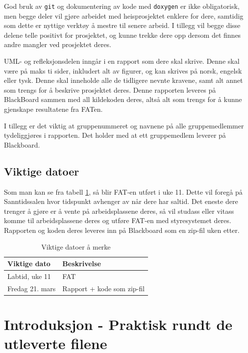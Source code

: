 \begin{alphasection}
God bruk av \verb|git| og dokumentering av kode med \verb|doxygen| er ikke obligatorisk, men begge deler vil gjøre arbeidet med heisprosjektet enklere for dere, samtidig som dette er nyttige verktøy å mestre til senere arbeid. I tillegg vil begge disse delene telle positivt for prosjektet, og kunne trekke dere opp dersom det finnes andre mangler ved prosjektet deres.

UML- og refleksjonsdelen inngår i en rapport som dere skal skrive. Denne skal være på maks ti sider, inkludert alt av figurer, og kan skrives på norsk, engelsk eller tysk. Denne skal inneholde alle de tidligere nevnte kravene, samt alt annet som trengs for å beskrive prosjektet deres. Denne rapporten leveres på BlackBoard sammen med all kildekoden deres, altså alt som trengs for å kunne gjenskape resultatene fra FATen.

I tillegg er det viktig at gruppenummeret og navnene på alle gruppemedlemmer tydeliggjøres i rapporten. Det holder med at ett gruppemedlem leverer på Blackboard.

\subsection*{Viktige datoer}
Som man kan se fra tabell \ref{tab:viktige-dato}, så blir FAT-en utført i uke 11. Dette vil foregå på Sanntidssalen hvor tidspunkt avhenger av når dere har saltid. Det eneste dere trenger å gjøre er å vente på arbeidsplassene deres, så vil studass eller vitass komme til arbeidsplassene deres og utføre FAT-en med styresystemet deres. Rapporten og koden deres leveres inn på Blackboard som en zip-fil uken etter.

\begin{table}[ht]
\centering
 \begin{tabular}{|p{4cm} p{5.5cm}|} 
 \hline
 Viktige dato & Beskrivelse \\ [0.5ex] 
 \hline\hline
  Labtid, uke 11 & FAT \\
 \hline
  Fredag 21. mars & Rapport + kode som zip-fil \\
 \hline
\end{tabular}
\caption{Viktige datoer å merke}
\label{tab:viktige-dato} 
\end{table}

\section{Introduksjon - Praktisk rundt de utleverte filene}


\end{alphasection}
